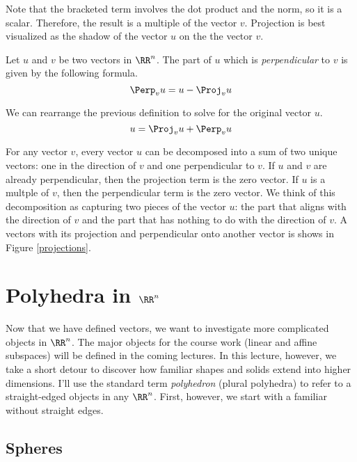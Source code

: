 \documentclass[fleqn]{report}
\begin{document}
Note that the bracketed term involves the dot product and the norm, so
it is a scalar. Therefore, the result is a multiple of
the vector $v$. Projection is best visualized as the shadow
of the vector $u$ on the the vector $v$.

\begin{defn}
Let $u$ and $v$ be two vectors in $\RR^n$. The part of $u$ which
is \emph{perpendicular} to $v$ is given by the following
formula.
\begin{equation*}
\Perp_v u = u - \Proj_v u
\end{equation*}
\end{defn}

We can rearrange the previous definition to solve for the
original vector $u$.
\begin{equation*}
u = \Proj_v u + \Perp_v u
\end{equation*}

For any vector $v$, every vector $u$ can be decomposed into a
sum of two unique vectors: one in the direction of $v$ and one
perpendicular to $v$. If $u$ and $v$ are already
perpendicular, then the projection term is the zero vector. If
$u$ is a multple of $v$, then the perpendicular term is the
zero vector. We think of this decomposition as capturing two
pieces of the vector $u$: the part that aligns with the
direction of $v$ and the part that has nothing to do with the
direction of $v$. A vectors with its projection and
perpendicular onto another vector is shows in Figure
\ref{projections}. 

\section{Polyhedra in $\RR^n$}
\label{polyhedra}

Now that we have defined vectors, we want to investigate
more complicated objects in $\RR^n$. The major objects for the
course work (linear and affine subspaces) will be defined in
the coming lectures. In this lecture, however, we take a short
detour to discover how familiar shapes and solids extend into
higher dimensions. I'll use the standard term
\emph{polyhedron} (plural polyhedra) to refer to a
straight-edged objects in any $\RR^n$. First, however, we
start with a familiar without straight edges.

\subsection{Spheres}
\label{spheres}
\end{document}
